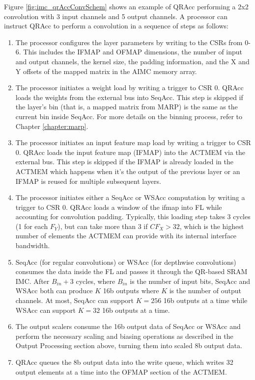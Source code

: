 Figure \ref{fig:imc_qrAccConvSchem} shows an example of QRAcc performing a 2x2 convolution with 3 input channels and 5 output channels. A processor can instruct QRAcc to perform a convolution in a sequence of steps as follows: 

\begin{enumerate}
    \item The processor configures the layer parameters by writing to the CSRs from 0-6. This includes the IFMAP and OFMAP dimensions, the number of input and output channels, the kernel size, the padding information, and the X and Y offsets of the mapped matrix in the AIMC memory array.
    \item The processor initiates a weight load by writing a trigger to CSR 0. QRAcc loads the weights from the external bus into SeqAcc. This step is skipped if the layer's bin (that is, a mapped matrix from MARP) is the same as the current bin inside SeqAcc. For more details on the binning process, refer to Chapter \ref{chapter:marp}.
    \item The processor initiates an input feature map load by writing a trigger to CSR 0. QRAcc loads the input feature map (IFMAP) into the ACTMEM via the external bus. This step is skipped if the IFMAP is already loaded in the ACTMEM which happens when it's the output of the previous layer or an IFMAP is reused for multiple subsequent layers.
    \item The processor initiates either a SeqAcc or WSAcc computation by writing a trigger to CSR 0. QRAcc loads a window of the ifmap into FL while accounting for convolution padding. Typically, this loading step takes 3 cycles (1 for each $F_Y$), but can take more than 3 if $CF_X > 32$, which is the highest number of elements the ACTMEM can provide with its internal interface bandwidth.
    \item SeqAcc (for regular convolutions) or WSAcc (for depthwise convolutions) consumes the data inside the FL and passes it through the QR-based SRAM IMC. After $B_{in}+3$ cycles, where $B_{in}$ is the number of input bits, SeqAcc and WSAcc both can produce $K$ 16b outputs where $K$ is the number of output channels. At most, SeqAcc can support $K=256$ 16b outputs at a time while WSAcc can support $K=32$ 16b outputs at a time.
    \item The output scalers consume the 16b output data of SeqAcc or WSAcc and perform the necessary scaling and biasing operations as described in the Output Processing section above, turning them into scaled 8b output data.
    \item QRAcc queues the 8b output data into the write queue, which writes 32 output elements at a time into the OFMAP section of the ACTMEM.

\end{enumerate}

